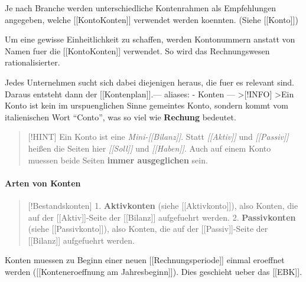 Je nach Branche werden unterschiedliche Kontenrahmen als Empfehlungen
angegeben, welche {[}{[}Konto\textbar Konten{]}{]} verwendet werden
koennten. (Siehe {[}{[}Konto{]}{]})

Um eine gewisse Einheitlichkeit zu schaffen, werden Kontonummern anstatt
von Namen fuer die {[}{[}Konto\textbar Konten{]}{]} verwendet. So wird
das Rechnungswesen rationalisierter.

Jedes Unternehmen sucht sich dabei diejenigen heraus, die fuer es
relevant sind. Daraus entsteht dann der {[}{[}Kontenplan{]}{]}.---
aliases: - Konten --- \textgreater{[}!INFO{]} \textgreater Ein Konto ist
kein im urspuenglichen Sinne gemeintes Konto, sondern kommt vom
italienischen Wort ``Conto'', was so viel wie \textbf{Rechung} bedeutet.

\begin{quote}
{[}!HINT{]} Ein Konto ist eine \emph{Mini-{[}{[}Bilanz{]}{]}}. Statt
\emph{{[}{[}Aktiv{]}{]}} und \emph{{[}{[}Passiv{]}{]}} heißen die Seiten
hier \emph{{[}{[}Soll{]}{]}} und \emph{{[}{[}Haben{]}{]}}. Auch auf
einem Konto muessen beide Seiten \textbf{immer ausgeglichen} sein.
\end{quote}

\paragraph{Arten von Konten}\label{arten-von-konten}

\begin{quote}
{[}!Bestandskonten{]} 1. \textbf{Aktivkonten} (siehe
{[}{[}Aktivkonto{]}{]}), also Konten, die auf der
{[}{[}Aktiv{]}{]}-Seite der {[}{[}Bilanz{]}{]} aufgefuehrt werden. 2.
\textbf{Passivkonten} (siehe {[}{[}Passivkonto{]}{]}), also Konten, die
auf der {[}{[}Passiv{]}{]}-Seite der {[}{[}Bilanz{]}{]} aufgefuehrt
werden.
\end{quote}

Konten muessen zu Beginn einer neuen {[}{[}Rechnungsperiode{]}{]} einmal
eroeffnet werden ({[}{[}Konteneroeffnung am Jahresbeginn{]}{]}). Dies
geschieht ueber das {[}{[}EBK{]}{]}.

